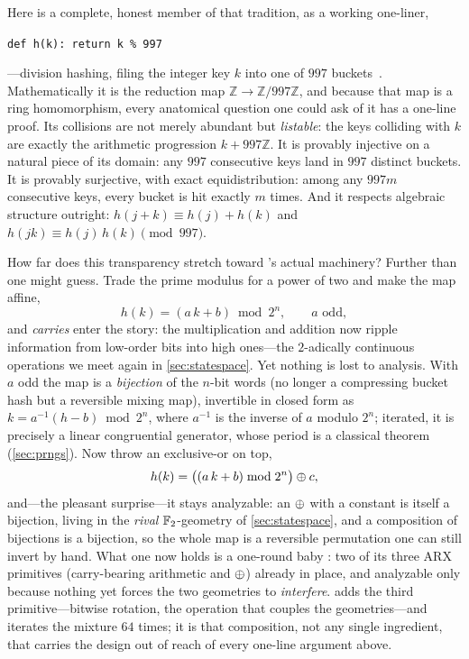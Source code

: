 Here is a complete, honest member of that tradition, as a working
one-liner,
\begin{center}
  \texttt{def h(k): return k \% 997}
\end{center}
---division hashing, filing the integer key $k$ into one of $997$
buckets~\citep[\S 6.4]{Knuth1998}. Mathematically it is the reduction
map $\mathbb{Z} \to \mathbb{Z}/997\mathbb{Z}$, and because that map is a
ring homomorphism, every anatomical question one could ask of it has a
one-line proof. Its collisions are not merely abundant but
\emph{listable}: the keys colliding with $k$ are exactly the arithmetic
progression $k + 997\mathbb{Z}$. It is provably injective on a natural
piece of its domain: any $997$ consecutive keys land in $997$ distinct
buckets. It is provably surjective, with exact equidistribution: among
any $997m$ consecutive keys, every bucket is hit exactly $m$ times. And
it respects algebraic structure outright:
$h(j+k) \equiv h(j) + h(k)$ and $h(jk) \equiv h(j)\,h(k) \pmod{997}$.

How far does this transparency stretch toward \SHA{}'s actual machinery?
Further than one might guess. Trade the prime modulus for a power of two
and make the map affine,
\[
  h(k) = (a\,k + b) \bmod 2^{n}, \qquad a \text{ odd},
\]
and \emph{carries} enter the story: the multiplication and addition now
ripple information from low-order bits into high ones---the $2$-adically
continuous operations we meet again in \cref{sec:statespace}. Yet nothing
is lost to analysis. With $a$ odd the map is a \emph{bijection} of the
$n$-bit words (no longer a compressing bucket hash but a reversible
mixing map), invertible in closed form as $k = a^{-1}(h - b) \bmod 2^{n}$,
where $a^{-1}$ is the inverse of $a$ modulo $2^{n}$; iterated, it is
precisely a linear congruential generator, whose period is a classical
theorem (\cref{sec:prngs}). Now throw an exclusive-or on top,
\[
  h(k) = \bigl((a\,k + b) \bmod 2^{n}\bigr) \oplus c,
\]
and---the pleasant surprise---it stays analyzable: an $\oplus$ with a
constant is itself a bijection, living in the \emph{rival}
$\mathbb{F}_2$-geometry of \cref{sec:statespace}, and a composition of bijections
is a bijection, so the whole map is a reversible permutation one can still
invert by hand. What one now holds is a one-round baby \SHA{}: two of its
three ARX primitives (carry-bearing arithmetic and $\oplus$) already in
place, and analyzable only because nothing yet forces the two geometries
to \emph{interfere}. \SHA{} adds the third primitive---bitwise rotation,
the operation that couples the geometries---and iterates the mixture
$64$ times; it is that composition, not any single ingredient, that
carries the design out of reach of every one-line argument above.

